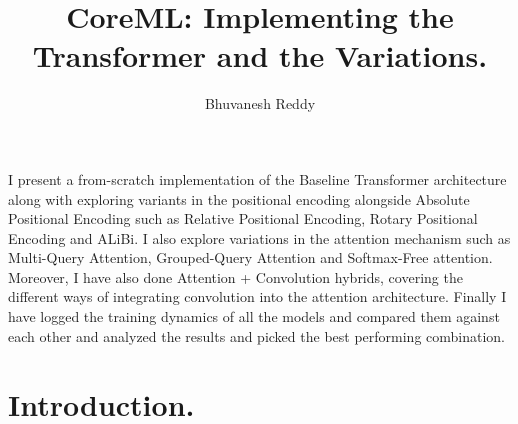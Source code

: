 \documentclass[10pt]{article}
\title{%
    CoreML: Implementing the Transformer and the Variations.
}
\author{%
    Bhuvanesh Reddy
}
\date{\small\muted{\today}}
\theoremstyle{plain}
\begin{document}

\maketitle
\thispagestyle{empty}

\begin{tcolorbox}[
    enhanced,
    colback=altbgraised,
    colframe=altborder,
    coltext=alttext,
    arc=0pt, outer arc=0pt,
    boxrule=0.5pt,
    sharp corners,
    left=6pt, right=6pt, top=5pt, bottom=5pt,
    before upper={\textbf{\small Abstract.}\hspace{0.5em}}
]
\small
I present a from-scratch implementation of the Baseline Transformer architecture along with exploring variants in the positional encoding alongside Absolute Positional Encoding such as Relative Positional Encoding, Rotary Positional Encoding and ALiBi. I also explore variations in the attention mechanism such as Multi-Query Attention, Grouped-Query Attention and Softmax-Free attention. Moreover, I have also done Attention + Convolution hybrids, covering the different ways of integrating convolution into the attention architecture. Finally I have logged the training dynamics of all the models and compared them against each other and analyzed the results and picked the best performing combination. 
\end{tcolorbox}

\vspace{0.5em}


\section{Introduction.}
\end{document}
